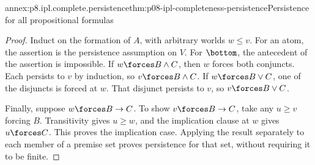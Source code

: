 \begin{annexitem}{annex:p8.ipl.complete.persistence}{thm:p08-ipl-completeness-persistence}{Persistence for all propositional formulas}
\begin{proof}
Induct on the formation of \(A\), with arbitrary worlds \(w\leq v\).
For an atom, the assertion is the persistence assumption on \(V\).
For \(\bottom\), the antecedent of the assertion is impossible.
If \(w\forces B\land C\), then \(w\) forces both conjuncts.
Each persists to \(v\) by induction, so \(v\forces B\land C\).
If \(w\forces B\lor C\), one of the disjuncts is forced at \(w\).
That disjunct persists to \(v\), so \(v\forces B\lor C\).

Finally, suppose \(w\forces B\to C\). To show
\(v\forces B\to C\), take any \(u\geq v\) forcing \(B\).
Transitivity gives \(u\geq w\), and the implication clause at \(w\)
gives \(u\forces C\). This proves the implication case. Applying the
result separately to each member of a premise set proves persistence for
that set, without requiring it to be finite.
\end{proof}
\end{annexitem}

